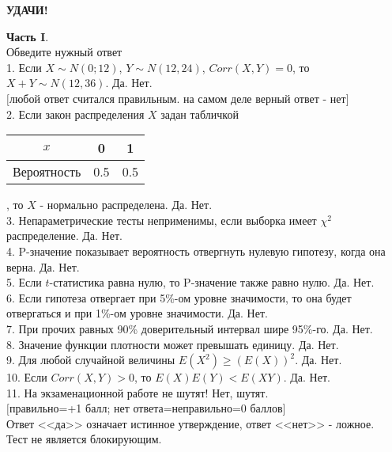 \documentclass[pdftex,12pt,a4paper]{article}
\begin{document}
\textbf{УДАЧИ!}

\pagebreak \textbf{Часть I}. \\
Обведите нужный ответ \\

1. Если $X\sim N(0;12)$, $Y\sim N(12,24)$, $Corr(X,Y)=0$, то
$X+Y\sim N(12,36)$.
Да. Нет. \\
$[$любой ответ считался правильным. на самом деле верный ответ -
нет$]$ \\

2. Если закон распределения $X$ задан табличкой

\begin{tabular}{|c|c|c|}
  \hline
  $x$ & 0 & 1 \\
  \hline
  Вероятность & 0.5 & 0.5 \\
  \hline
\end{tabular}, то $X$ - нормально распределена. Да. Нет. \\

3. Непараметрические тесты неприменимы, если выборка имеет
$\chi^{2}$ распределение. Да. Нет.
\\

4. P-значение показывает вероятность отвергнуть нулевую
гипотезу, когда она верна. Да. Нет. \\

5. Если $t$-статистика равна нулю, то P-значение также равно
нулю. Да. Нет. \\

6. Если гипотеза отвергает при 5\%-ом уровне значимости, то
она будет отвергаться и при 1\%-ом уровне значимости. Да. Нет. \\

7. При прочих равных 90\% доверительный интервал шире 95\%-го. Да. Нет. \\

8. Значение функции плотности может превышать единицу. Да. Нет. \\

9. Для любой случайной величины  $E(X^{2} )\ge
(E(X))^{2}$. Да. Нет. \\

10. Если $Corr(X,Y)>0$, то $E(X)E(Y)<E(XY)$. Да. Нет. \\

11. На экзаменационной работе не шутят! Нет, шутят. \\


$[$правильно=+1 балл; нет ответа=неправильно=0 баллов$]$ \\
Ответ <<да>> означает истинное утверждение, ответ <<нет>> - ложное. \\
Тест не является блокирующим. \\
\end{document}
